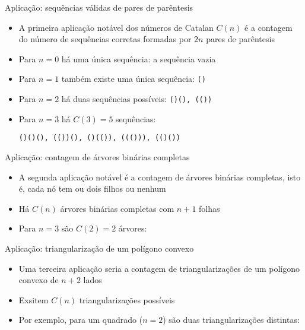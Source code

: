 \begin{frame}[fragile]{Aplicação: sequências válidas de pares de parêntesis}

    \begin{itemize}
        \item A primeira aplicação notável dos números de Catalan $C(n)$ é a contagem do número de
            sequências corretas formadas por $2n$ pares de parêntesis

        \item Para $n = 0$ há uma única sequência: a sequência vazia

        \item Para $n = 1$ também existe uma única sequência: \texttt{()}

        \item Para $n = 2$ há duas sequências possíveis: \texttt{()(), (())}

        \item Para $n = 3$ há $C(3) = 5$ sequências:

\begin{center}
\texttt{()()(), (())(), ()(()), ((())), (()())}
\end{center}
    \end{itemize}

\end{frame}

\begin{frame}[fragile]{Aplicação: contagem de árvores binárias completas}

    \begin{itemize}
        \item A segunda aplicação notável é a contagem de árvores binárias completas, isto é, cada
            nó tem ou dois filhos ou nenhum

        \item Há $C(n)$ árvores binárias completas com $n + 1$ folhas

        \item Para $n = 3$ são $C(2) = 2$ árvores:

        

    \end{itemize}

\end{frame}

\begin{frame}[fragile]{Aplicação: triangularização de um polígono convexo}

    \begin{itemize}
        \item Uma terceira aplicação seria a contagem de triangularizações de um polígono convexo
            de $n+2$ lados

        \item Exsitem $C(n)$ triangularizações possíveis

        \item Por exemplo, para um quadrado ($n = 2$) são duas triangularizações distintas:

        
    \end{itemize}

\end{frame}
